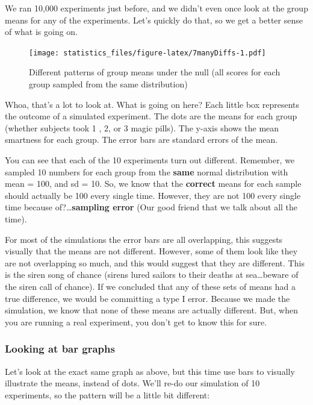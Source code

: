 \documentclass[]{book}
\begin{document}
We ran 10,000 experiments just before, and we didn't even once look at the group means for any of the experiments. Let's quickly do that, so we get a better sense of what is going on.

\begin{figure}
\centering
\texttt{[image: statistics\_files/figure-latex/7manyDiffs-1.pdf]}
\caption{\label{fig:7manyDiffs}Different patterns of group means under the null (all scores for each group sampled from the same distribution)}
\end{figure}

Whoa, that's a lot to look at. What is going on here? Each little box represents the outcome of a simulated experiment. The dots are the means for each group (whether subjects took 1 , 2, or 3 magic pills). The y-axis shows the mean smartness for each group. The error bars are standard errors of the mean.

You can see that each of the 10 experiments turn out different. Remember, we sampled 10 numbers for each group from the \textbf{same} normal distribution with mean = 100, and sd = 10. So, we know that the \textbf{correct} means for each sample should actually be 100 every single time. However, they are not 100 every single time because of?\ldots{}\textbf{sampling error} (Our good friend that we talk about all the time).

For most of the simulations the error bars are all overlapping, this suggests visually that the means are not different. However, some of them look like they are not overlapping so much, and this would suggest that they are different. This is the siren song of chance (sirens lured sailors to their deaths at sea\ldots{}beware of the siren call of chance). If we concluded that any of these sets of means had a true difference, we would be committing a type I error. Because we made the simulation, we know that none of these means are actually different. But, when you are running a real experiment, you don't get to know this for sure.

\hypertarget{looking-at-bar-graphs}{%
\subsubsection{Looking at bar graphs}\label{looking-at-bar-graphs}}

Let's look at the exact same graph as above, but this time use bars to visually illustrate the means, instead of dots. We'll re-do our simulation of 10 experiments, so the pattern will be a little bit different:
\end{document}
